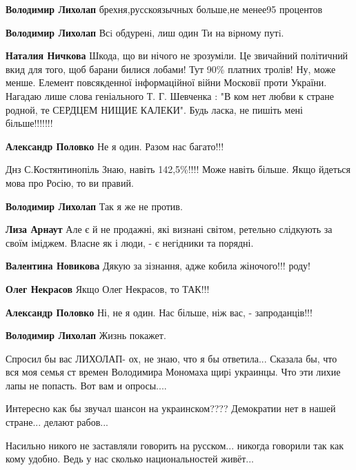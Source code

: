 \begin{itemize}
\begin{itemize}
\textbf{Володимир Лихолап} брехня,русскоязычных больше,не менее95 процентов

\textbf{Володимир Лихолап} Всi обдуренi, лиш один Ти на вiрному путi.

\textbf{Наталия Ничкова} Шкода, що ви нічого не зрозуміли. Це звичайний політичний вкид
для того, щоб барани билися лобами! Тут 90\% платних тролів! Ну, може менше.
Елемент повсякденної інформаційної війни Московії проти України. Нагадаю лише
слова геніального Т. Г. Шевченка : "В ком нет любви к стране родной, те СЕРДЦЕМ
НИЩИЕ КАЛЕКИ". Будь ласка, не пишіть мені більше!!!!!!!

\textbf{Александр Половко} Не я один. Разом нас багато!!!


Днз С.Костянтинопіль Знаю, навіть 142,5\%!!!! Може навіть більше. Якщо йдеться мова про Росію, то ви правий.

\textbf{Володимир Лихолап} Так я же не против.

\textbf{Лиза Арнаут} Але є й не продажні, які визнані світом, ретельно слідкують за своїм іміджем. Власне як і люди, - є негідники та порядні.

\textbf{Валентина Новикова} Дякую за зізнання, адже кобила жіночого!!! роду!

\textbf{Олег Некрасов} Якщо Олег Некрасов, то ТАК!!!

\textbf{Александр Половко} Ні, не я один. Нас більше, ніж вас, - запроданців!!!

\textbf{Володимир Лихолап} Жизнь покажет.

Спросил бы вас ЛИХОЛАП- ох, не знаю, что я бы ответила... Сказала бы, что вся моя семья ст времен Володимира Мономаха щирi украинцы. Что эти лихие лапы не попасть. Вот вам и опросы....


\end{itemize}


Интересно как бы звучал шансон на украинском???? Демократии нет в нашей
стране... делают рабов...


Насильно никого не заставляли говорить на русском... никогда говорили так как
кому удобно. Ведь у нас сколько национальностей живёт...


\end{itemize}
